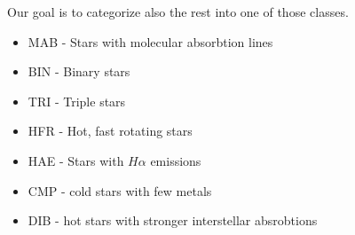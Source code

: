 \documentclass{article}
\begin{document}
Our goal is to categorize also the rest into one of those classes.
\begin{itemize}
\item MAB - Stars with molecular absorbtion lines
\item BIN - Binary stars
\item TRI - Triple stars
\item HFR - Hot, fast rotating stars
\item HAE - Stars with $H\alpha$ emissions
\item CMP - cold stars with few metals
\item DIB - hot stars with stronger interstellar absrobtions
\end{itemize}
\end{document}
